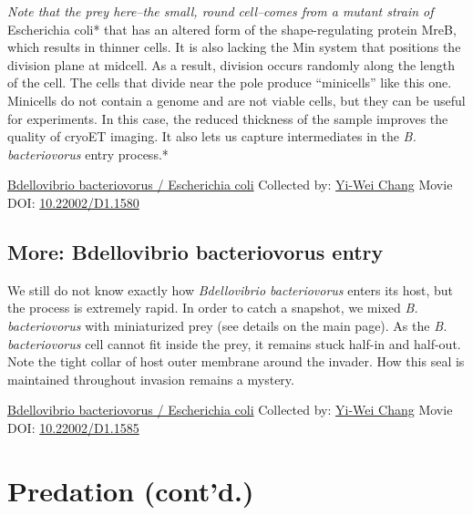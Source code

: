 \documentclass[]{tufte-book}
\begin{document}
\emph{Note that the prey here--the small, round cell--comes from a mutant strain of }Escherichia coli* that has an altered form of the shape-regulating protein MreB, which results in thinner cells. It is also lacking the Min system that positions the division plane at midcell. As a result, division occurs randomly along the length of the cell. The cells that divide near the pole produce ``minicells'' like this one. Minicells do not contain a genome and are not viable cells, but they can be useful for experiments. In this case, the reduced thickness of the sample improves the quality of cryoET imaging. It also lets us capture intermediates in the \emph{B. bacteriovorus} entry process.*



\hypertarget{htmlwidget-bed6e7aaf1ca5f4c5acc}{}

\label{fig:9-10}\protect\hyperlink{tree}{Bdellovibrio bacteriovorus / Escherichia coli} Collected by: \protect\hyperlink{yi-wei_chang}{Yi-Wei Chang} Movie DOI: \href{https://doi.org/10.22002/D1.1580}{10.22002/D1.1580}

\hypertarget{Bdellovibrio_bacteriovorus_entry}{%
\subsection*{More: Bdellovibrio bacteriovorus entry}\label{Bdellovibrio_bacteriovorus_entry}}

We still do not know exactly how \emph{Bdellovibrio bacteriovorus} enters its host, but the process is extremely rapid. In order to catch a snapshot, we mixed \emph{B. bacteriovorus} with miniaturized prey (see details on the main page). As the \emph{B. bacteriovorus} cell cannot fit inside the prey, it remains stuck half-in and half-out. Note the tight collar of host outer membrane around the invader. How this seal is maintained throughout invasion remains a mystery.



\hypertarget{htmlwidget-774a6f5bde82ce793b57}{}

\label{fig:9-10a}\protect\hyperlink{tree}{Bdellovibrio bacteriovorus / Escherichia coli} Collected by: \protect\hyperlink{yi-wei_chang}{Yi-Wei Chang} Movie DOI: \href{https://doi.org/10.22002/D1.1585}{10.22002/D1.1585}

\hypertarget{predation-contd.-1}{%
\section{Predation (cont'd.)}\label{predation-contd.-1}}
\end{document}
